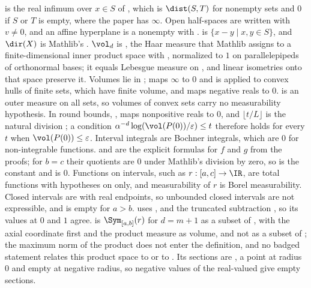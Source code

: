  is the real infimum over $x\in S$ of , which is $\dist(S,T)$ for nonempty sets and $0$ if $S$ or $T$ is empty, where the paper has $\infty$. Open half-spaces are written  with $v\neq0$, and an affine hyperplane is a nonempty  with .  is $\{x-y\mid x,y\in S\}$, and $\dir(X)$ is Mathlib's . $\vol_d$ is , the Haar measure that Mathlib assigns to a finite-dimensional inner product space with \lean{[MeasurableSpace V] [BorelSpace V]}, normalized to $1$ on parallelepipeds of orthonormal bases; it equals Lebesgue measure on , and linear isometries onto that space preserve it. Volumes lie in ;  maps $\infty$ to $0$ and is applied to convex hulls of finite sets, which have finite volume, and  maps negative reals to $0$.  is an outer measure on all sets, so volumes of convex sets carry no measurability hypothesis. In round bounds, ,  maps nonpositive reals to $0$, and $\lfloor t/L\rfloor$ is the natural division ; a condition $\alpha^{-d}\log(\vol(P(0))/\varepsilon)\leq t$ therefore holds for every $t$ when $\vol(P(0))\leq\varepsilon$. Interval integrals  are Bochner integrals, which are $0$ for non-integrable functions.  and  are the explicit formulas for $f$ and $g$ from the proofs; for $b=c$ their quotients are $0$ under Mathlib's division by zero, so  is the constant  and  is $0$. Functions on intervals, such as $r:[a,c]\to\IR$, are total functions  with hypotheses on  only, and measurability of $r$ is Borel measurability. Closed intervals are  with real endpoints, so unbounded closed intervals are not expressible, and  is empty for $a>b$.  uses ,  and the truncated subtraction , so its values at $0$ and $1$ agree.  is $\Sym_{[a,b]}(r)$ for $d=m+1$ as a subset of , with the axial coordinate first and the product measure as volume, and not as a subset of ; the maximum norm of the product does not enter the definition, and no badged statement relates this product space to  or to . Its sections are , a point at radius $0$ and empty at negative radius, so negative values of the real-valued  give empty sections.

